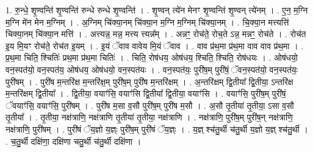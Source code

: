 \documentclass[17pt]{extarticle}
\begin{document}
1. रु॒न्धे॒ शृ॒ण्वन्ति॑ शृ॒ण्वन्ति॑ रुन्धे रुन्धे शृ॒ण्वन्ति॑ । . शृ॒ण्वन् त्ये॑न मेनꣳ शृ॒ण्वन्ति॑ शृ॒ण्वन् त्ये॑नम् । . ए॒न॒ म॒ग्नि म॒ग्नि मे॑न मेन म॒ग्निम् । . अ॒ग्निम् चि॑क्या॒नम् चि॑क्या॒न म॒ग्नि म॒ग्निम् चि॑क्या॒नम् । . चि॒क्या॒न मत्त्यत्ति॑ चिक्या॒नम् चि॑क्या॒न मत्ति॑ । . अत्त्यन्न॒ मन्न॒ मत्त्य त्त्यन्न᳚म् । . अन्नꣳ॒॒ रोच॑ते॒ रोच॒ते ऽन्न॒ मन्नꣳ॒॒ रोच॑ते । . रोच॑त इ॒य मि॒यꣳ रोच॑ते॒ रोच॑त इ॒यम् । . इ॒यं ॅवाव वावेय मि॒यं ॅवाव । . वाव प्र॑थ॒मा प्र॑थ॒मा वाव वाव प्र॑थ॒मा । . प्र॒थ॒मा चिति॒ श्चितिः॑ प्रथ॒मा प्र॑थ॒मा चितिः॑ । . चिति॒ रोष॑धय॒ ओष॑धय॒ श्चिति॒ श्चिति॒ रोष॑धयः । . ओष॑धयो॒ वन॒स्पत॑यो॒ वन॒स्पत॑य॒ ओष॑धय॒ ओष॑धयो॒ वन॒स्पत॑यः । . वन॒स्पत॑यः॒ पुरी॑ष॒म् पुरी॑षं॒ ॅवन॒स्पत॑यो॒ वन॒स्पत॑यः॒ पुरी॑षम् । . पुरी॑ष म॒न्तरि॑क्ष म॒न्तरि॑क्ष॒म् पुरी॑ष॒म् पुरी॑ष म॒न्तरि॑क्षम् । . अ॒न्तरि॑क्षम् द्वि॒तीया᳚ द्वि॒तीया॒ ऽन्तरि॑क्ष म॒न्तरि॑क्षम् द्वि॒तीया᳚ । . द्वि॒तीया॒ वयाꣳ॑सि॒ वयाꣳ॑सि द्वि॒तीया᳚ द्वि॒तीया॒ वयाꣳ॑सि । . वयाꣳ॑सि॒ पुरी॑ष॒म् पुरी॑षं॒ ॅवयाꣳ॑सि॒ वयाꣳ॑सि॒ पुरी॑षम् । . पुरी॑ष म॒सा व॒सौ पुरी॑ष॒म् पुरी॑ष म॒सौ । . अ॒सौ तृ॒तीया॑ तृ॒तीया॒ ऽसा व॒सौ तृ॒तीया᳚ । . तृ॒तीया॒ नक्ष॑त्राणि॒ नक्ष॑त्राणि तृ॒तीया॑ तृ॒तीया॒ नक्ष॑त्राणि । . नक्ष॑त्राणि॒ पुरी॑ष॒म् पुरी॑ष॒न् नक्ष॑त्राणि॒ नक्ष॑त्राणि॒ पुरी॑षम् । . पुरी॑षं ॅय॒ज्ञो य॒ज्ञ्ः पुरी॑ष॒म् पुरी॑षं ॅय॒ज्ञ्ः । . य॒ज्ञ् श्च॑तु॒र्थी च॑तु॒र्थी य॒ज्ञो य॒ज्ञ् श्च॑तु॒र्थी । . च॒तु॒र्थी दक्षि॑णा॒ दक्षि॑णा चतु॒र्थी च॑तु॒र्थी दक्षि॑णा । \newline
\end{document}
